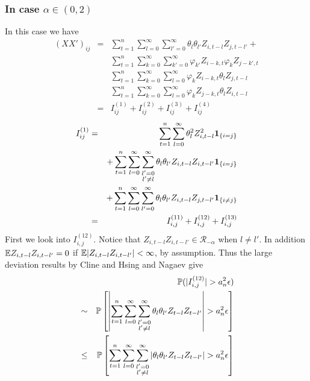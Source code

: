 \documentclass{article}
\begin{document}
\subsubsection[alpha in (0,2)]{In case $\alpha \in (0,2)$}
In this case we have
\begin{eqnarray*}
  (XX')_{ij} &=& \sum_{t=1}^n \sum_{l=0}^\infty \sum_{l'=0}^\infty
  \theta_l\theta_{l'} Z_{i,t-l} Z_{j,t-l'} + \\
  && \sum_{t=1}^n \sum_{k=0}^\infty \sum_{k'=0}^\infty \varphi_{k'}
  Z_{i-k,t} \varphi_k Z_{j-k',t} \\
  && \sum_{t=1}^n \sum_{k=0}^\infty \sum_{l=0}^\infty \varphi_k
  Z_{i-k,t} \theta_l Z_{j,t-l} \\
  && \sum_{t=1}^n \sum_{k=0}^\infty \sum_{l=0}^\infty \varphi_k
  Z_{j-k,t} \theta_l Z_{i,t-l} \\
  &=& I^{(1)}_{ij} + I^{(2)}_{ij} + I^{(3)}_{ij} + I^{(4)}_{ij}
\end{eqnarray*}
\begin{eqnarray*}
  I^{(1)}_{ij} &=& \sum_{t=1}^n \sum_{l=0}^\infty \theta_{l}^2
  Z_{i,t-l}^2 \mathbf{1}_{\{i=j\}}\\
  && + \sum_{t=1}^n \sum_{l=0}^\infty \sum_{\substack{l'=0 \\l'\neq
      l}}^\infty \theta_l\theta_{l'} Z_{i,t-l} Z_{i,t-l'} \mathbf{1}_{\{i=j\}} \\
  && + \sum_{t=1}^n \sum_{l=0}^\infty \sum_{l'=0}^\infty
  \theta_l\theta_{l'} Z_{i,t-l} Z_{j,t-l'} \mathbf{1}_{\{i\neq j\}} \\
  &=& I^{(11)}_{i,j} + I^{(12)}_{i,j} + I^{(13)}_{i,j} \\
\end{eqnarray*}
First we look into $I^{(12)}_{i,j}$. Notice that $Z_{i,t-l}
Z_{i,t-l'} \in \mathcal R_{-\alpha}$ when $l \neq l'$. In addition $\mathbb{E}
Z_{i,t-l} Z_{i,t-l'} = 0$ if $\mathbb{E}|Z_{i,t-l} Z_{i,t-l'}| < \infty$, by
assumption. Thus the large deviation results by Cline and Hsing
\cite{ClingHsing1998} and Nagaev \cite{nagaev1979} give
\begin{eqnarray*}
  && \mathbb{P}(|I^{(12)}_{i,j}| > a_n^2 \epsilon) \\
  &\sim& \mathbb{P}\left[\left|
    \sum_{t=1}^n \sum_{l=0}^\infty \sum_{\substack{l'=0 \\l'\neq
        l}}^\infty \theta_l\theta_{l'} Z_{t-l} Z_{t-l'} \right|
    > a_n^2 \epsilon\right] \\
  &\leq& \mathbb{P}\left[
    \sum_{t=1}^n \sum_{l=0}^\infty \sum_{\substack{l'=0 \\l'\neq
        l}}^\infty \left|\theta_l\theta_{l'} Z_{t-l} Z_{t-l'} \right|
    > a_n^2 \epsilon\right]
\end{eqnarray*}
\end{document}
